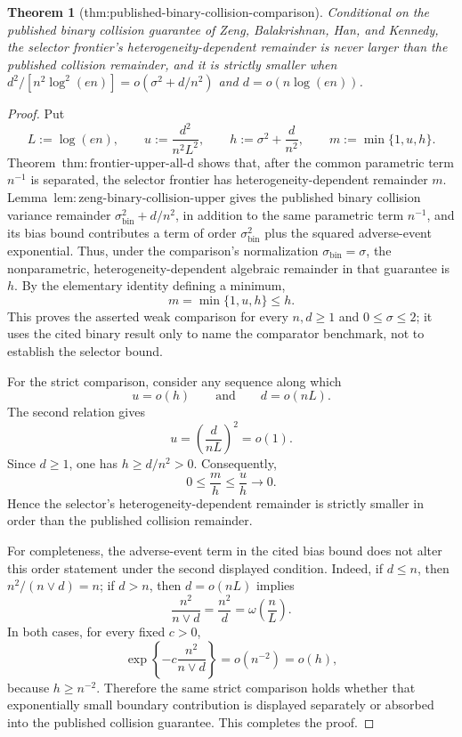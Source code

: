 \documentclass{article}
\newtheorem{theorem}{Theorem}
\begin{document}
\begin{theorem}[thm:published-binary-collision-comparison]\label{thm:published-binary-collision-comparison}
Conditional on the published binary collision guarantee of Zeng, Balakrishnan, Han, and Kennedy, the selector frontier's heterogeneity-dependent remainder is never larger than the published collision remainder, and it is strictly smaller when \(d^2/[n^2\log^2(en)]=o(\sigma^2+d/n^2)\) and \(d=o(n\log(en))\).
\end{theorem}
\begin{proof}
Put
\[
 L:=\log(en),\qquad
 u:=\frac{d^2}{n^2L^2},\qquad
 h:=\sigma^2+\frac d{n^2},
 \qquad m:=\min\{1,u,h\}.
\]
Theorem~\(\mathrm{thm:frontier\text{-}upper\text{-}all\text{-}d}\) shows that, after the common parametric term \(n^{-1}\) is separated, the selector frontier has heterogeneity-dependent remainder \(m\).  Lemma~\(\mathrm{lem:zeng\text{-}binary\text{-}collision\text{-}upper}\) gives the published binary collision variance remainder \(\sigma_{\mathrm{bin}}^2+d/n^2\), in addition to the same parametric term \(n^{-1}\), and its bias bound contributes a term of order \(\sigma_{\mathrm{bin}}^2\) plus the squared adverse-event exponential.  Thus, under the comparison's normalization \(\sigma_{\mathrm{bin}}=\sigma\), the nonparametric, heterogeneity-dependent algebraic remainder in that guarantee is \(h\).  By the elementary identity defining a minimum,
\[
 m=\min\{1,u,h\}\le h.
\]
This proves the asserted weak comparison for every \(n,d\ge1\) and \(0\le\sigma\le2\); it uses the cited binary result only to name the comparator benchmark, not to establish the selector bound.

For the strict comparison, consider any sequence along which
\[
 u=o(h)
 \qquad\text{and}\qquad
 d=o(nL).
\]
The second relation gives
\[
 u=\left(\frac d{nL}\right)^2=o(1).
\]
Since \(d\ge1\), one has \(h\ge d/n^2>0\).  Consequently,
\[
 0\le \frac{m}{h}
 \le \frac{u}{h}
 \longrightarrow0.
\]
Hence the selector's heterogeneity-dependent remainder is strictly smaller in order than the published collision remainder.

For completeness, the adverse-event term in the cited bias bound does not alter this order statement under the second displayed condition.  Indeed, if \(d\le n\), then \(n^2/(n\vee d)=n\); if \(d>n\), then \(d=o(nL)\) implies
\[
 \frac{n^2}{n\vee d}=\frac{n^2}{d}=\omega\!\left(\frac nL\right).
\]
In both cases, for every fixed \(c>0\),
\[
 \exp\!\left\{-c\frac{n^2}{n\vee d}\right\}=o(n^{-2})=o(h),
\]
because \(h\ge n^{-2}\).  Therefore the same strict comparison holds whether that exponentially small boundary contribution is displayed separately or absorbed into the published collision guarantee.  This completes the proof.
\end{proof}
\end{document}

